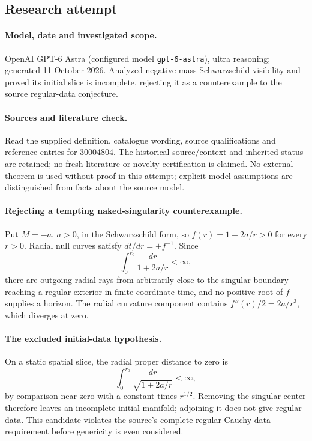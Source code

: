 \documentclass[11pt]{article}
\begin{document}
\subsection{Research attempt}
\paragraph{Model, date and investigated scope.}
OpenAI GPT-6 Astra (configured model \texttt{gpt-6-astra}), ultra reasoning; generated 11 October 2026. Analyzed negative-mass Schwarzschild visibility and proved its initial slice is incomplete, rejecting it as a counterexample to the source regular-data conjecture.

\paragraph{Sources and literature check.}
Read the supplied definition, catalogue wording, source qualifications and reference entries for 30004804. The historical source/context and inherited status are retained; no fresh literature or novelty certification is claimed. No external theorem is used without proof in this attempt; explicit model assumptions are distinguished from facts about the source model.

\paragraph{Rejecting a tempting naked-singularity counterexample.} Put \(M=-a\), \(a>0\), in the Schwarzschild form, so \(f(r)=1+2a/r>0\) for every \(r>0\). Radial null curves satisfy \(dt/dr=\pm f^{-1}\). Since
\[
 \int_0^{r_0}\frac{dr}{1+2a/r}<\infty,
\]
there are outgoing radial rays from arbitrarily close to the singular boundary reaching a regular exterior in finite coordinate time, and no positive root of \(f\) supplies a horizon. The radial curvature component contains \(f''(r)/2=2a/r^3\), which diverges at zero.
\paragraph{The excluded initial-data hypothesis.} On a static spatial slice, the radial proper distance to zero is
\[
 \int_0^{r_0}\frac{dr}{\sqrt{1+2a/r}}<\infty,
\]
by comparison near zero with a constant times \(r^{1/2}\). Removing the singular center therefore leaves an incomplete initial manifold; adjoining it does not give regular data. This candidate violates the source's complete regular Cauchy-data requirement before genericity is even considered.
\end{document}

